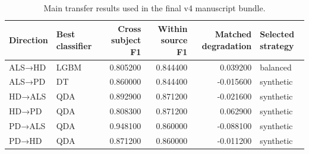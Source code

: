 \begin{table}
\caption{Main transfer results used in the final v4 manuscript bundle.}
\label{tab:step7-master-transfer}
\begin{tabular}{llrrrl}
\toprule
Direction & Best classifier & Cross subject F1 & Within source F1 & Matched degradation & Selected strategy \\
\midrule
ALS→HD & LGBM & 0.805200 & 0.844400 & 0.039200 & balanced \\
ALS→PD & DT & 0.860000 & 0.844400 & -0.015600 & synthetic \\
HD→ALS & QDA & 0.892900 & 0.871200 & -0.021600 & synthetic \\
HD→PD & QDA & 0.808300 & 0.871200 & 0.062900 & synthetic \\
PD→ALS & QDA & 0.948100 & 0.860000 & -0.088100 & synthetic \\
PD→HD & QDA & 0.871200 & 0.860000 & -0.011200 & synthetic \\
\bottomrule
\end{tabular}
\end{table}
